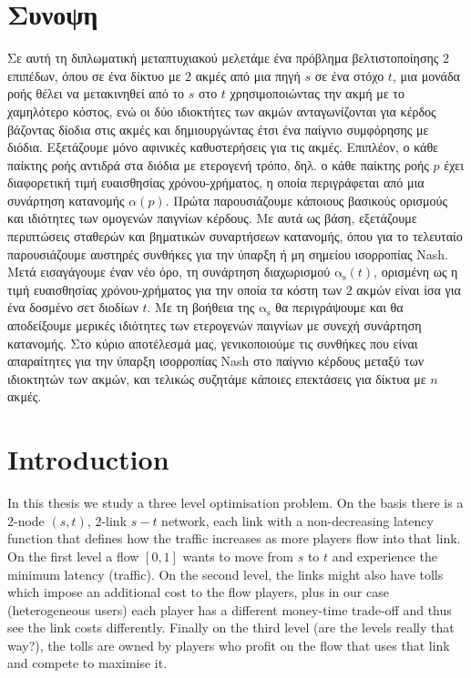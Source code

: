 \documentclass[10pt,a4paper]{book}
\newcommand{\as}{\mathrm{\alpha_s}}
\theoremstyle{definition}
\theoremstyle{comment}
\begin{document}
\chapter*{Συνοψη}
Σε αυτή τη διπλωματική μεταπτυχιακού μελετάμε ένα πρόβλημα βελτιστοποίησης $2$ επιπέδων, όπου σε ένα δίκτυο με $2$ ακμές από μια πηγή $s$ σε ένα στόχο $t$, μια μονάδα ροής θέλει να μετακινηθεί από το $s$ στο $t$ χρησιμοποιώντας την ακμή με το χαμηλότερο κόστος, ενώ οι δύο ιδιοκτήτες των ακμών ανταγωνίζονται για κέρδος βάζοντας δίοδια στις ακμές και δημιουργώντας έτσι ένα παίγνιο συμφόρησης με διόδια.
Εξετάζουμε μόνο αφινικές καθυστερήσεις για τις ακμές.
Επιπλέον, ο κάθε παίκτης ροής αντιδρά στα διόδια με ετερογενή τρόπο, δηλ. ο κάθε παίκτης ροής $p$ έχει διαφορετική τιμή ευαισθησίας χρόνου-χρήματος, η οποία περιγράφεται από μια συνάρτηση κατανομής $\alpha(p)$.
Πρώτα παρουσιάζουμε κάποιους βασικούς ορισμούς και ιδιότητες των ομογενών παιγνίων κέρδους. Mε αυτά ως βάση, εξετάζουμε περιπτώσεις σταθερών και βηματικών συναρτήσεων κατανομής, όπου για το τελευταίο παρουσιάζουμε αυστηρές συνθήκες για την ύπαρξη ή μη σημείου ισορροπίας Nash.
Μετά εισαγάγουμε έναν νέο όρο, τη συνάρτηση διαχωρισμού $\as(t)$, ορισμένη ως η τιμή ευαισθησίας χρόνου-χρήματος για την οποία τα κόστη των $2$ ακμών είναι ίσα για ένα δοσμένο σετ διοδίων $t$.
Με τη βοήθεια της $\as$ θα περιγράψουμε και θα αποδείξουμε μερικές ιδιότητες των ετερογενών παιγνίων με συνεχή συνάρτηση κατανομής.
Στο κύριο αποτέλεσμά μας, γενικοποιούμε τις συνθήκες που είναι απαραίτητες για την ύπαρξη ισορροπίας Nash στο παίγνιο κέρδους μεταξύ των ιδιοκτητών των ακμών, και τελικώς συζητάμε κάποιες επεκτάσεις για δίκτυα με $n$ ακμές.
\clearpage

\thispagestyle{empty}
\null
\clearpage

\pagestyle{fancy}

\tableofcontents
\clearpage

\thispagestyle{empty}
\null
\clearpage



\chapter{Introduction}

In this thesis we study a three level optimisation problem.
On the basis there is a 2-node $(s, t)$, 2-link $s-t$ network, each link with a non-decreasing latency function that defines how the traffic increases as more players flow into that link.
On the first level a flow $[0, 1]$ wants to move from $s$ to $t$ and experience the minimum latency (traffic).
On the second level, the links might also have tolls which impose an additional cost to the flow players, plus in our case (heterogeneous users) each player has a different money-time trade-off and thus see the link costs differently.
Finally on the third level (are the levels really that way?), the tolls are owned by players who profit on the flow that uses that link and compete to maximise it.
\end{document}
